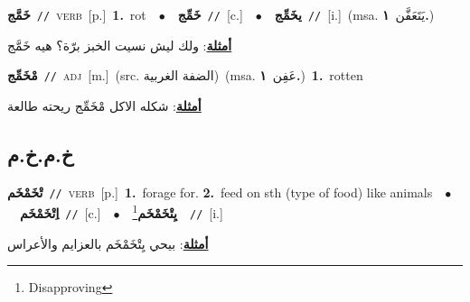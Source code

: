 \documentclass[10pt,a4paper,twoside]{article} %
\begin{document}
\begin{multicols}{2}
{\setlength\topsep{0pt}\textbf{\foreignlanguage{arabic}{خَمَّج}}\ {\color{gray}\texttt{//}\color{black}}\ \textsc{verb}\ [p.]\ \textbf{1.}~rot\ \ $\bullet$\ \ \setlength\topsep{0pt}\textbf{\foreignlanguage{arabic}{خَمِّج}}\ {\color{gray}\texttt{//}\color{black}}\ [c.]\ \ $\bullet$\ \ \setlength\topsep{0pt}\textbf{\foreignlanguage{arabic}{يخَمِّج}}\ {\color{gray}\texttt{//}\color{black}}\ [i.]\ \color{gray}(msa. \foreignlanguage{arabic}{يَتَعَفَّن}~\foreignlanguage{arabic}{\textbf{١.}})\color{black}\  \begin{flushright}\color{gray}\foreignlanguage{arabic}{\textbf{\underline{\foreignlanguage{arabic}{أمثلة}}}: ولك ليش نسيت الخبز برّة؟ هيه خَمَّج}\end{flushright}\color{black}} \vspace{2mm}

{\setlength\topsep{0pt}\textbf{\foreignlanguage{arabic}{مْخَمِّج}}\ {\color{gray}\texttt{//}\color{black}}\ \textsc{adj}\ [m.]\ (src. \color{gray}\foreignlanguage{arabic}{الضفة الغربية}\color{black})\ \color{gray}(msa. \foreignlanguage{arabic}{عَفِن}~\foreignlanguage{arabic}{\textbf{١.}})\color{black}\ \textbf{1.}~rotten\  \begin{flushright}\color{gray}\foreignlanguage{arabic}{\textbf{\underline{\foreignlanguage{arabic}{أمثلة}}}: شكله الاكل مْخَمِّج ريحته طالعة}\end{flushright}\color{black}} \vspace{2mm}

\vspace{-3mm}
\subsection*{\color{blue}\foreignlanguage{arabic}{خ.م.خ.م}\color{blue}{}} 

{\setlength\topsep{0pt}\textbf{\foreignlanguage{arabic}{تْخَمْخَم}}\ {\color{gray}\texttt{//}\color{black}}\ \textsc{verb}\ [p.]\ \textbf{1.}~forage for.  \textbf{2.}~feed on sth (type of food) like animals\ \ $\bullet$\ \ \setlength\topsep{0pt}\textbf{\foreignlanguage{arabic}{اِتْخَمْخَم}}\ {\color{gray}\texttt{//}\color{black}}\ [c.]\ \ $\bullet$\ \ \setlength\topsep{0pt}\textbf{\foreignlanguage{arabic}{يِتْخَمْخَم}}\footnote{Disapproving}\ \ {\color{gray}\texttt{//}\color{black}}\ [i.]\  \begin{flushright}\color{gray}\foreignlanguage{arabic}{\textbf{\underline{\foreignlanguage{arabic}{أمثلة}}}: بيحي يِتْخَمْخَم بالعزايم والأعراس}\end{flushright}\color{black}} \vspace{2mm}


\end{multicols}
\end{document}
